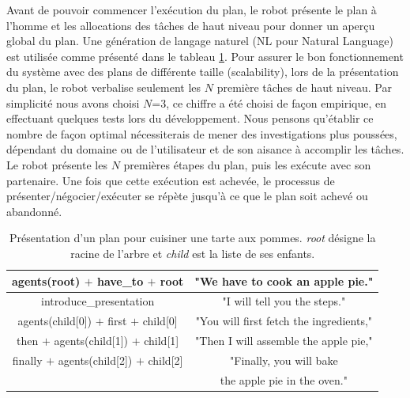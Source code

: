\documentclass[a4paper,11pt,twoside]{StyleThese}
\begin{document}
Avant de pouvoir commencer l'exécution du plan, le robot présente le plan à l'homme et les allocations des tâches de haut niveau pour donner un aperçu global du plan. Une génération de langage naturel (NL pour Natural Language) est utilisée comme présenté dans le tableau \ref{table:pie-present}. 
Pour assurer le bon fonctionnement du système avec des plans de différente taille (scalability), lors de la présentation du plan, le robot verbalise seulement les  $N$ première tâches de haut niveau. Par simplicité nous avons choisi $N$=$3$, ce chiffre a été choisi de façon empirique, en effectuant quelques tests lors du développement. Nous pensons qu'établir ce nombre de façon optimal nécessiterais de mener des investigations plus poussées, dépendant du domaine ou de l'utilisateur et de son aisance à accomplir les tâches. Le robot présente les $N$ premières étapes du plan, puis les exécute avec son partenaire. Une fois que cette exécution est achevée, le processus de présenter/négocier/exécuter se répète jusqu'à ce que le plan soit achevé ou abandonné.


 
 
 \begin{table}
\centering
\scriptsize
\renewcommand{\arraystretch}{1.3}
\begin{tabular}{|c|c|}
\hline
   agents(root) $+$ have\_to $+$ root  & "We have to cook an apple pie." \\
   \hline
   introduce\_presentation & "I will tell you the steps." \\
   \hline
   agents(child[0]) $+$ first $+$ child[0] & "You will first fetch the ingredients," \\
   \hline
   then $+$ agents(child[1]) $+$  child[1] & "Then I will assemble the apple pie," \\
   \hline
   finally $+$ agents(child[2]) $+$  child[2] & "Finally, you will bake \\
   & the apple pie in the oven." \\
   \hline
\end{tabular}
 \vspace{-4pt}
\caption{Présentation d'un plan pour cuisiner une tarte aux pommes. \textit{root} désigne la racine de l'arbre et \textit{child} est la liste de ses enfants.}
 \label{table:pie-present}    
\end{table}
 
\end{document}
